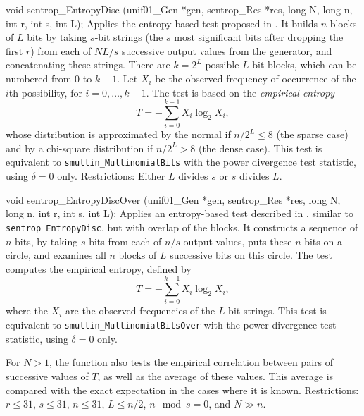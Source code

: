 void sentrop_EntropyDisc (unif01_Gen *gen, sentrop_Res *res,
                          long N, long n, int r, int s, int L);
\endcode
\tab
  Applies the entropy-based test
   proposed in \cite{rLEC96e}.
  It builds $n$ blocks of $L$ bits by taking $s$-bit strings
  (the $s$ most significant bits after dropping the first $r$) from each of
  $NL/s$ successive output values from the generator, and concatenating
  these strings.
  There are $k=2^L$ possible $L$-bit blocks, which can be numbered
  from 0 to $k-1$.  Let $X_i$ be the observed frequency of occurrence
  of the $i$th possibility, for $i=0,\dots,k-1$.
  The test is based on the {\em empirical entropy\/}
   $$ T = -\sum_{i = 0}^{k-1} X_i \log_2 X_i, $$
  whose distribution is approximated by the normal if $n/2^L \le 8$
  (the sparse case) and by a chi-square distribution if $n/2^L > 8$
  (the dense case).
  This test is equivalent to {\tt smultin\_Multino\-mial\-Bits} with the
  power divergence test statistic, using $\delta=0$ only.
\iffalse  %
  If $s$ divides $L$, it is equivalent to calling
  {\tt smultin\_Multinomial} with $d=2^s$, $t= L/s$, and
  looking at the result for $\delta=0$.
\fi  %
  Restrictions: Either $L$ divides $s$ or $s$ divides $L$.
\endtab
\code


void sentrop_EntropyDiscOver (unif01_Gen *gen, sentrop_Res *res,
                              long N, long n, int r, int s, int L);
\endcode
\tab
  Applies an entropy-based test
  described in \cite{rLEC96e}, similar
  to {\tt sentrop\_EntropyDisc}, but with overlap of the blocks.
  It constructs a sequence of $n$ bits, by taking $s$ bits from each
  of $n/s$ output values, puts these $n$ bits on a circle,
  and examines all $n$ blocks of $L$ successive bits on this circle.
  The test computes the empirical entropy, defined by
   $$ T = -\sum_{i = 0}^{k-1} X_i \log_2 X_i, $$
  where the $X_i$ are the observed frequencies of the $L$-bit strings.
  This test is equivalent to {\tt smultin\_MultinomialBitsOver} with the
  power divergence test statistic, using $\delta=0$ only.

  For $N>1$, the function also tests the empirical correlation
  between pairs of successive values of $T$, as well as the average
  of these values.  This average is compared with the exact expectation
  in the cases where it is known.
  Restrictions:  $r\le 31$, $s\le 31$, $n\le 31$, $L \le n/2$,
  $n \mod s = 0$, and $N \gg n$.
\endtab
\code


